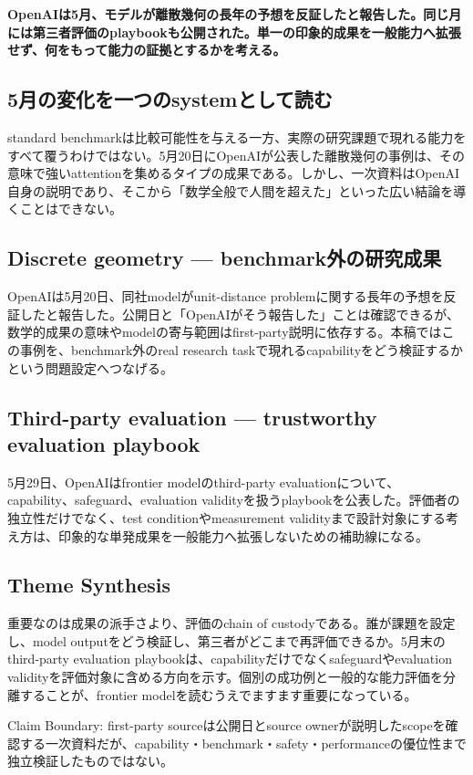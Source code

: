 \noindent\textbf{OpenAIは5月、モデルが離散幾何の長年の予想を反証したと報告した。同じ月には第三者評価のplaybookも公開された。単一の印象的成果を一般能力へ拡張せず、何をもって能力の証拠とするかを考える。}\autocite{src-1c93d6c1c725,src-8c84b8422093}

\subsection{5月の変化を一つのsystemとして読む}

standard benchmarkは比較可能性を与える一方、実際の研究課題で現れる能力をすべて覆うわけではない。5月20日にOpenAIが公表した離散幾何の事例は、その意味で強いattentionを集めるタイプの成果である。しかし、一次資料はOpenAI自身の説明であり、そこから「数学全般で人間を超えた」といった広い結論を導くことはできない。\autocite{src-1c93d6c1c725,src-8c84b8422093}


\subsection{Discrete geometry — benchmark外の研究成果}

OpenAIは5月20日、同社modelがunit-distance problemに関する長年の予想を反証したと報告した。公開日と「OpenAIがそう報告した」ことは確認できるが、数学的成果の意味やmodelの寄与範囲はfirst-party説明に依存する。本稿ではこの事例を、benchmark外のreal research taskで現れるcapabilityをどう検証するかという問題設定へつなげる。\autocite{src-1c93d6c1c725}


\subsection{Third-party evaluation — trustworthy evaluation playbook}

5月29日、OpenAIはfrontier modelのthird-party evaluationについて、capability、safeguard、evaluation validityを扱うplaybookを公表した。評価者の独立性だけでなく、test conditionやmeasurement validityまで設計対象にする考え方は、印象的な単発成果を一般能力へ拡張しないための補助線になる。\autocite{src-8c84b8422093}


\subsection{Theme Synthesis}

重要なのは成果の派手さより、評価のchain of custodyである。誰が課題を設定し、model outputをどう検証し、第三者がどこまで再評価できるか。5月末のthird-party evaluation playbookは、capabilityだけでなくsafeguardやevaluation validityを評価対象に含める方向を示す。個別の成功例と一般的な能力評価を分離することが、frontier modelを読むうえでますます重要になっている。\autocite{src-1c93d6c1c725,src-8c84b8422093}


\begin{claimboundary}
Claim Boundary: first-party sourceは公開日とsource ownerが説明したscopeを確認する一次資料だが、capability・benchmark・safety・performanceの優位性まで独立検証したものではない。\autocite{src-1c93d6c1c725,src-8c84b8422093}
\end{claimboundary}
